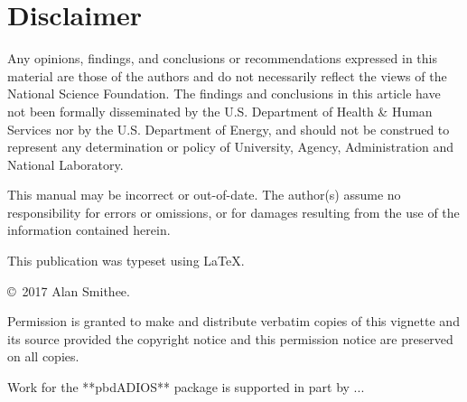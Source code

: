 \section*{Disclaimer}
Any opinions, findings, and conclusions or recommendations expressed in  this 
material are those of the authors and do not necessarily reflect the  views of 
the National Science Foundation.  The findings and conclusions in this article 
have not been formally disseminated by the U.S. Department of Health \& Human 
Services nor by the U.S. Department of Energy, and should not be construed to 
represent any determination or policy of University, Agency, Administration and 
National Laboratory.

This manual may be incorrect or out-of-date.  The author(s) assume
no responsibility for errors or omissions, or for damages resulting
from the use of the information contained herein.

This publication was typeset using \LaTeX.

\vfill

\null
\vfill
\copyright\ 2017 Alan Smithee.

Permission is granted to make and distribute verbatim copies of this vignette 
and its source provided the copyright notice and this permission notice are 
preserved on all copies.

Work for the **pbdADIOS** package is supported in part by ...

